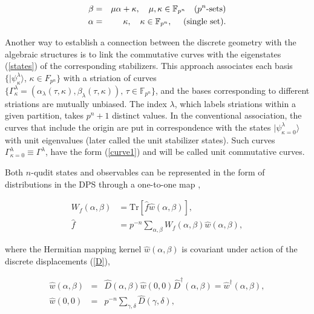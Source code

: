 \documentclass[quantumrep,article,submit,pdftex,moreauthors]{Definitions/mdpi}
\begin{document}
\begin{eqnarray}
  \beta &=& \mu \alpha + \kappa,
  \quad \mu,\kappa \in \mathbb{F}_{p^{n}}
  \quad \text{($p^{n}$-sets)}
  \label{rays0} \\
  \alpha &=& \kappa,
  \quad \kappa \in \mathbb{F}_{p^{n}},
  \quad \text{ (single set).} 
  \notag
\end{eqnarray}

Another way to establish a connection between the discrete geometry with the
algebraic structures is to link the commutative curves with the eigenstates
(\ref{states}) of the corresponding stabilizers. This approach associates each
basis $\{|\psi_{\kappa}^{\lambda}\rangle$, $\kappa \in F_{p^{n}}\}$ with a
striation of curves $\{\Gamma_{\kappa }^{\lambda } = \left(\alpha_{\lambda
}(\tau,\kappa ),\beta_{\lambda }(\tau,\kappa )\right), \, \tau \in
\mathbb{F}_{p^n}\}$, and the bases
corresponding to different striations are mutually unbiased. The index
$\lambda$, which labels striations within a given partition, takes $p^{n}+1$
distinct values. In the conventional association, the curves that include the
origin are put in correspondence with the states
$|\psi_{\kappa=0}^{\lambda}\rangle$ with unit eigenvalues (later called the
unit stabilizer states). Such curves $\Gamma_{\kappa=0}^{\lambda} \equiv
\Gamma^{\lambda}$, have the form (\ref{curve1}) and will be called unit
commutative curves.

Both $n$-qudit states and observables can be represented in the form of
distributions in the DPS through a one-to-one map
\cite{gross,DFW2-1,DFW2-2,DFW2-3,DFW2-4}, 

\begin{align}
  W_{f}\left( \alpha ,\beta \right)
  &= \mathrm{Tr}\left[ \hat{f}\hat{w}\left(
  \alpha ,\beta
  \right) \right],
  \label{map} \\
  \hat{f}
  &= p^{-n}\sum_{\alpha, \beta } W_{f}(\alpha,\beta) \hat{w}(\alpha,\beta),
\end{align}

where the Hermitian mapping kernel $\hat{w}\left(\alpha,\beta\right)$ is
covariant under action of the discrete displacements (\ref{D}),

\begin{eqnarray}
  \hat{w}\left(\alpha,\beta\right)
  &=& \hat{D}\left(\alpha,\beta\right) 
  \hat{w}\left( 0,0\right) \hat{D}^{\dagger }\left( \alpha ,\beta \right)
  = \hat{w}^{\dagger }(\alpha ,\beta ),
  \label{Ds} \\
  \hat{w}\left(0,0\right)
  &=& p^{-n} \sum_{\gamma,\delta} \hat{D}(\gamma,\delta),
  \label{Dw0}
\end{eqnarray}
\end{document}

